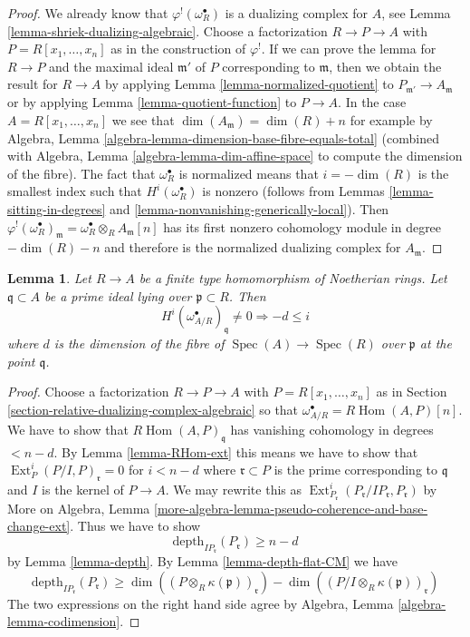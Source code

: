 \documentclass{stacks-project}
\theoremstyle{plain}
\newtheorem{lemma}[subsection]{Lemma}
\theoremstyle{definition}
\theoremstyle{remark}
\numberwithin{equation}{subsection}
\def\Spec{\mathop{\mathrm{Spec}}}
\def\Hom{\mathop{\mathrm{Hom}}\nolimits}
\def\Ext{\mathop{\mathrm{Ext}}\nolimits}
\begin{document}
\begin{proof}
We already know that $\varphi^!(\omega_R^\bullet)$ is a dualizing
complex for $A$, see Lemma \ref{lemma-shriek-dualizing-algebraic}.
Choose a factorization $R \to P \to A$ with $P = R[x_1, \ldots, x_n]$
as in the construction of $\varphi^!$. If we can prove the
lemma for $R \to P$ and the maximal ideal $\mathfrak m'$ of $P$ corresponding to
$\mathfrak m$, then we obtain the result for $R \to A$ by
applying Lemma \ref{lemma-normalized-quotient} to
$P_{\mathfrak m'} \to A_\mathfrak m$ or by applying
Lemma \ref{lemma-quotient-function} to $P \to A$.
In the case $A = R[x_1, \ldots, x_n]$ we see that
$\dim(A_\mathfrak m) = \dim(R) + n$ for example by
Algebra, Lemma \ref{algebra-lemma-dimension-base-fibre-equals-total}
(combined with Algebra, Lemma \ref{algebra-lemma-dim-affine-space}
to compute the dimension of the fibre).
The fact that $\omega_R^\bullet$ is normalized means
that $i = -\dim(R)$ is the smallest index such that
$H^i(\omega_R^\bullet)$ is nonzero (follows from
Lemmas \ref{lemma-sitting-in-degrees} and
\ref{lemma-nonvanishing-generically-local}).
Then $\varphi^!(\omega_R^\bullet)_\mathfrak m =
\omega_R^\bullet \otimes_R A_\mathfrak m[n]$
has its first nonzero cohomology module in degree $-\dim(R) - n$
and therefore is the normalized dualizing complex for $A_\mathfrak m$.
\end{proof}

\begin{lemma}
\label{lemma-relative-dualizing-trivial-vanishing}
Let $R \to A$ be a finite type homomorphism of Noetherian rings.
Let $\mathfrak q \subset A$ be a prime ideal lying over
$\mathfrak p \subset R$. Then
$$
H^i(\omega_{A/R}^\bullet)_\mathfrak q \not = 0
\Rightarrow - d \leq i
$$
where $d$ is the dimension of the fibre of $\Spec(A) \to \Spec(R)$
over $\mathfrak p$ at the point $\mathfrak q$.
\end{lemma}

\begin{proof}
Choose a factorization $R \to P \to A$ with $P = R[x_1, \ldots, x_n]$
as in Section \ref{section-relative-dualizing-complex-algebraic}
so that $\omega_{A/R}^\bullet = R\Hom(A, P)[n]$.
We have to show that $R\Hom(A, P)_\mathfrak q$
has vanishing cohomology in degrees $< n - d$.
By Lemma \ref{lemma-RHom-ext} this means we have to
show that $\Ext_P^i(P/I, P)_{\mathfrak r} = 0$ for $i < n - d$
where $\mathfrak r \subset P$ is the prime corresponding to $\mathfrak q$
and $I$ is the kernel of $P \to A$.
We may rewrite this as
$\Ext_{P_\mathfrak r}^i(P_\mathfrak r/IP_\mathfrak r, P_\mathfrak r)$
by More on Algebra, Lemma
\ref{more-algebra-lemma-pseudo-coherence-and-base-change-ext}.
Thus we have to show
$$
\text{depth}_{IP_\mathfrak r}(P_\mathfrak r) \geq n - d
$$
by Lemma \ref{lemma-depth}.
By Lemma \ref{lemma-depth-flat-CM} we have
$$
\text{depth}_{IP_\mathfrak r}(P_\mathfrak r) \geq
\dim((P \otimes_R \kappa(\mathfrak p))_\mathfrak r) -
\dim((P/I \otimes_R \kappa(\mathfrak p))_\mathfrak r)
$$
The two expressions on the right hand side agree by
Algebra, Lemma \ref{algebra-lemma-codimension}.
\end{proof}
\end{document}
